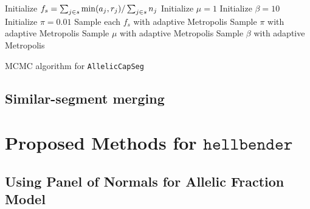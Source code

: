 \documentclass[nofootinbib,amssymb,amsmath]{revtex4}
\newcommand{\ACS}{\texttt{AllelicCapSeg}}
\begin{document}
\begin{algorithm}
\begin{algorithmic}[1]
	\State Initialize $f_s = \sum_{j \in s} {\rm min}(a_j, r_j) / \sum_{j \in s} n_j$
\EndFor
\State Initialize $\mu = 1$
\State Initialize $\beta = 10$
\State Initialize $\pi = 0.01$
\Repeat
	\State Sample each $f_s$ with adaptive Metropolis
	\State Sample $\pi$ with adaptive Metropolis
	\State Sample $\mu$ with adaptive Metropolis
	\State Sample $\beta$ with adaptive Metropolis
\end{algorithmic}
\caption{MCMC algorithm for \ACS}
\label{ACS_MCMC}
\end{algorithm}


\subsection{Similar-segment merging} \label{similar-segment-merging}


\section{Proposed Methods for $\texttt{hellbender}$} \label{proposed-methods-for-texttthellbender}

\subsection{Using Panel of Normals for Allelic Fraction Model} \label{allelic-PoN}
\end{document}
